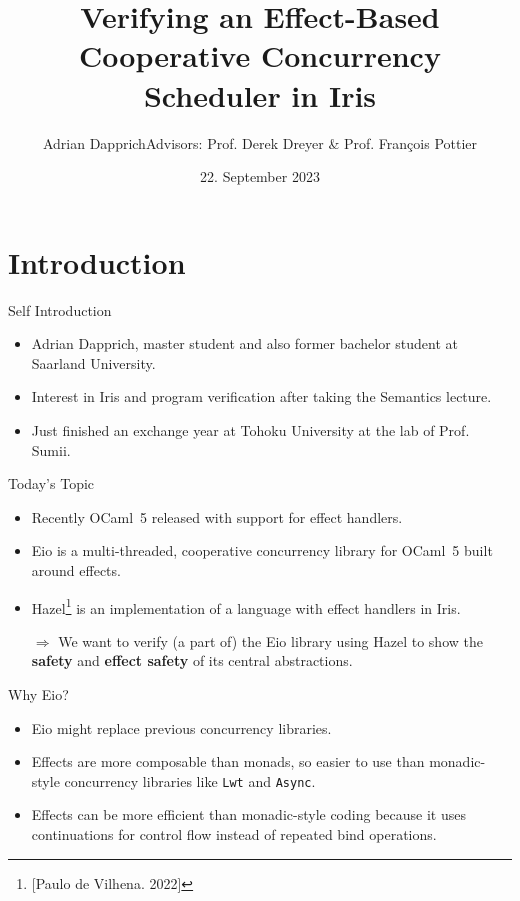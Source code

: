\documentclass[aspectratio=43]{beamer}
\title{Verifying an Effect-Based Cooperative Concurrency Scheduler in Iris}
\author{Adrian Dapprich\newline Advisors: Prof. Derek Dreyer \& Prof. François Pottier}
\institute{Dreyer Laboratory, MPI-SWS, Saarland University}
\date{22. September 2023}
\newcommand{\ocf}{OCaml~5}
\begin{document}
\frame{\titlepage}

\section{Introduction}

\begin{frame}{Self Introduction}
    \begin{itemize}
        \item Adrian Dapprich, master student and also former bachelor student at Saarland University.
        \item Interest in Iris and program verification after taking the Semantics lecture.
        \item Just finished an exchange year at Tohoku University at the lab of Prof. Sumii.
    \end{itemize}
\end{frame}

\begin{frame}{Today's Topic}
    \begin{itemize}
        \item Recently \ocf{} released with support for effect handlers.
        \item Eio is a multi-threaded, cooperative concurrency library for \ocf{} built around effects.
        \item Hazel\footnote{[Paulo de Vilhena. 2022]} is an implementation of a language with effect handlers in Iris.
        \item[\(\Rightarrow\)] We want to verify (a part of) the Eio library using Hazel to show the \textbf{safety} and \textbf{effect safety} of its central abstractions.
    \end{itemize}
\end{frame}

\begin{frame}{Why Eio?}
    \begin{itemize}
        \item Eio might replace previous concurrency libraries.
        \item Effects are more composable than monads, so easier to use than monadic-style concurrency libraries like \texttt{Lwt} and \texttt{Async}.
        \item Effects can be more efficient than monadic-style coding because it uses continuations for control flow instead of repeated bind operations.
    \end{itemize}
\end{frame}
\end{document}
